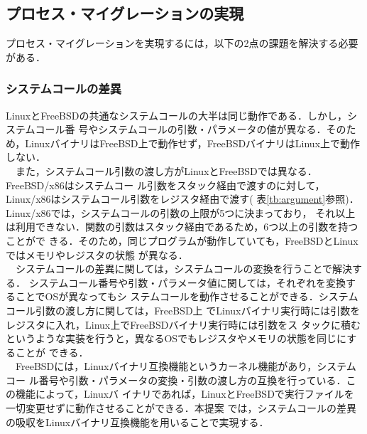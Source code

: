 \documentclass[11pt]{jarticle}
\begin{document}
\subsection{プロセス・マイグレーションの実現}
\label{sec:PM}
プロセス・マイグレーションを実現するには，以下の2点の課題を解決する必要がある．
\subsubsection{システムコールの差異}
  LinuxとFreeBSDの共通なシステムコールの大半は同じ動作である．しかし，システムコール番
  号やシステムコールの引数・パラメータの値が異なる．そのため，LinuxバイナリはFreeBSD上で動作せず，FreeBSDバイナリはLinux上で動作しない．\\
  　また，システムコール引数の渡し方がLinuxとFreeBSDでは異なる．FreeBSD/x86はシステムコー
  ル引数をスタック経由で渡すのに対して，Linux/x86はシステムコール引数をレジスタ経由で渡す(
  表\ref{tb:argument}参照)．Linux/x86では，システムコールの引数の上限が5つに決まっており，
  それ以上は利用できない．関数の引数はスタック経由であるため，6つ以上の引数を持つことがで
  きる．そのため，同じプログラムが動作していても，FreeBSDとLinuxではメモリやレジスタの状態
  が異なる．\\
  　システムコールの差異に関しては，システムコールの変換を行うことで解決する．
システムコール番号や引数・パラメータ値に関しては，それぞれを変換することでOSが異なってもシ
ステムコールを動作させることができる．システムコール引数の渡し方に関しては，FreeBSD上
でLinuxバイナリ実行時には引数をレジスタに入れ，Linux上でFreeBSDバイナリ実行時には引数をス
タックに積むというような実装を行うと，異なるOSでもレジスタやメモリの状態を同じにすることが
できる．\\
　FreeBSDには，Linuxバイナリ互換機能\cite{linux-emu}というカーネル機能があり，システムコー
ル番号や引数・パラメータの変換・引数の渡し方の互換を行っている．この機能によって，Linuxバ
イナリであれば，LinuxとFreeBSDで実行ファイルを一切変更せずに動作させることができる．本提案
では，システムコールの差異の吸収をLinuxバイナリ互換機能を用いることで実現する．
\end{document}
